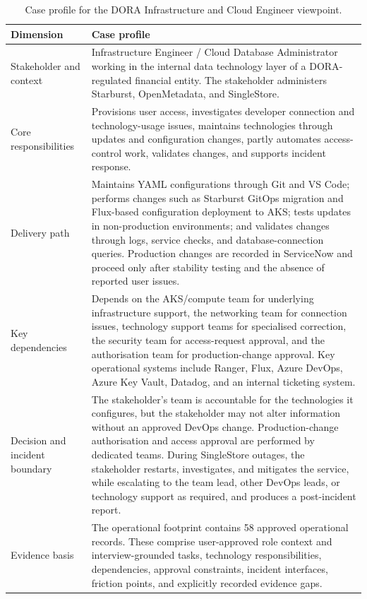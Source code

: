 \begin{table}[ht]
\centering
\small
\begin{tabular}{p{3.2cm} p{10.2cm}}
\hline
\textbf{Dimension} & \textbf{Case profile} \\
\hline
Stakeholder and context &
Infrastructure Engineer / Cloud Database Administrator working in the internal data technology layer of a \ac{DORA}-regulated financial entity. The stakeholder administers Starburst, OpenMetadata, and SingleStore. \\
\hline
Core responsibilities &
Provisions user access, investigates developer connection and technology-usage issues, maintains technologies through updates and configuration changes, partly automates access-control work, validates changes, and supports incident response. \\
\hline
Delivery path &
Maintains YAML configurations through Git and VS Code; performs changes such as Starburst GitOps migration and Flux-based configuration deployment to \ac{AKS}; tests updates in non-production environments; and validates changes through logs, service checks, and database-connection queries. Production changes are recorded in ServiceNow and proceed only after stability testing and the absence of reported user issues. \\
\hline
Key dependencies &
Depends on the \ac{AKS}/compute team for underlying infrastructure support, the networking team for connection issues, technology support teams for specialised correction, the security team for access-request approval, and the authorisation team for production-change approval. Key operational systems include Ranger, Flux, Azure DevOps, Azure Key Vault, Datadog, and an internal ticketing system. \\
\hline
Decision and incident boundary &
The stakeholder's team is accountable for the technologies it configures, but the stakeholder may not alter information without an approved DevOps change. Production-change authorisation and access approval are performed by dedicated teams. During SingleStore outages, the stakeholder restarts, investigates, and mitigates the service, while escalating to the team lead, other DevOps leads, or technology support as required, and produces a post-incident report. \\
\hline
Evidence basis &
The operational footprint contains 58 approved operational records. These comprise user-approved role context and interview-grounded tasks, technology responsibilities, dependencies, approval constraints, incident interfaces, friction points, and explicitly recorded evidence gaps. \\
\hline
\end{tabular}
\caption{Case profile for the \ac{DORA} Infrastructure  and  Cloud Engineer viewpoint.}
\label{tab:dora-infra-cloud-dba-profile}
\end{table}

